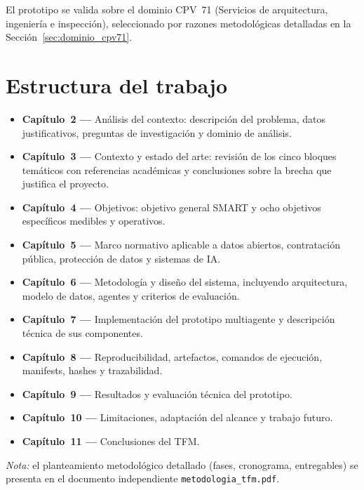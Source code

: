 \documentclass[11pt,a4paper,spanish]{book}
\numberwithin{equation}{chapter}
\numberwithin{figure}{chapter}
\begin{document}
El prototipo se valida sobre el dominio CPV~71 (Servicios de arquitectura, ingenier{\'i}a e inspecci{\'o}n), seleccionado por razones metodol{\'o}gicas detalladas en la Secci{\'o}n~\ref{sec:dominio_cpv71}.

\section{Estructura del trabajo}

\begin{itemize}
  \item \textbf{Cap{\'i}tulo~2 ---} An{\'a}lisis del contexto: descripci{\'o}n del problema, datos justificativos, preguntas de investigaci{\'o}n y dominio de an{\'a}lisis.
  \item \textbf{Cap{\'i}tulo~3 ---} Contexto y estado del arte: revisi{\'o}n de los cinco bloques tem{\'a}ticos con referencias acad{\'e}micas y conclusiones sobre la brecha que justifica el proyecto.
  \item \textbf{Cap{\'i}tulo~4 ---} Objetivos: objetivo general SMART y ocho objetivos espec{\'i}ficos medibles y operativos.
  \item \textbf{Cap{\'i}tulo~5 ---} Marco normativo aplicable a datos abiertos, contrataci{\'o}n p{\'u}blica, protecci{\'o}n de datos y sistemas de IA.
  \item \textbf{Cap{\'i}tulo~6 ---} Metodolog{\'i}a y dise{\~n}o del sistema, incluyendo arquitectura, modelo de datos, agentes y criterios de evaluaci{\'o}n.
  \item \textbf{Cap{\'i}tulo~7 ---} Implementaci{\'o}n del prototipo multiagente y descripci{\'o}n t{\'e}cnica de sus componentes.
  \item \textbf{Cap{\'i}tulo~8 ---} Reproducibilidad, artefactos, comandos de ejecuci{\'o}n, manifests, hashes y trazabilidad.
  \item \textbf{Cap{\'i}tulo~9 ---} Resultados y evaluaci{\'o}n t{\'e}cnica del prototipo.
  \item \textbf{Cap{\'i}tulo~10 ---} Limitaciones, adaptaci{\'o}n del alcance y trabajo futuro.
  \item \textbf{Cap{\'i}tulo~11 ---} Conclusiones del TFM.
\end{itemize}

\medskip
\textit{Nota:} el planteamiento metodol{\'o}gico detallado (fases, cronograma, entregables) se presenta en el documento independiente \texttt{metodologia\_tfm.pdf}.

\end{document}
